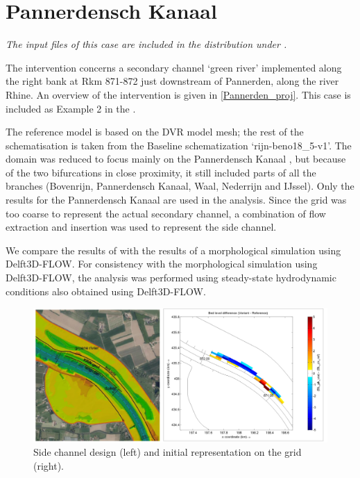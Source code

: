\section{Pannerdensch Kanaal} \label{Sec:PannerdenschCanal}

\emph{The input files of this case are included in the distribution under .}

The intervention concerns a secondary channel `green river' implemented along the right bank at Rkm 871-872 just downstream of Pannerden, along the river Rhine.
An overview of the intervention is given in \autoref{Pannerden_proj}.
This case is included as Example 2 in the \citet{um}.

The reference model is based on the DVR model mesh; the rest of the schematisation is taken from the Baseline schematization ‘rijn-beno18\_5-v1’.
The domain was reduced to focus mainly on the Pannerdensch Kanaal \citep{BomLeeuwen2020}, but because of the two bifurcations in close proximity, it still included parts of all the branches (Bovenrijn, Pannerdensch Kanaal, Waal, Nederrijn and IJssel).
Only the results for the Pannerdensch Kanaal are used in the analysis.
Since the grid was too coarse to represent the actual secondary channel, a combination of flow extraction and insertion was used to represent the side channel.

We compare the results of \dfmi with the results of a morphological simulation using Delft3D-FLOW.
For consistency with the morphological simulation using Delft3D-FLOW, the \dfmi analysis was performed using steady-state hydrodynamic conditions also obtained using Delft3D-FLOW.

\begin{figure}
\includegraphics[width=\columnwidth]{figures/Pannerden_proj.png}
\caption{Side channel design (left) and initial representation on the grid (right).}
\label{Pannerden_proj}
\end{figure}

